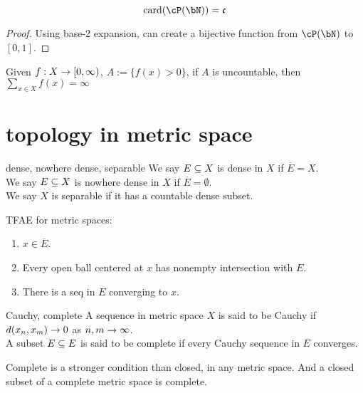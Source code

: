 \documentclass[lang=cn,11pt]{elegantbook}
\begin{document}
\begin{proposition}
    \begin{equation}
        \card(\cP(\bN)) = \mathfrak{c}
    \end{equation}
\end{proposition}
\begin{proof}
    Using base-2 expansion, can create a bijective function from $\cP(\bN)$ to $[0,1]$.
\end{proof}


\begin{proposition}
    Given $f: X \rightarrow [0,\infty)$, $A:= \{ f(x)>0 \}$, if $A$ is uncountable, then $\sum_{x \in X}f(x) = \infty$
\end{proposition}


\section{topology in metric space}
\begin{definition}{dense, nowhere dense, separable}
We say $E \subseteq X$ is dense in $X$ if $\overline{E} = X$.\\
We say $E \subseteq X$ is nowhere dense in $X$ if 
$\overline{E} = \emptyset $.\\
We say $X$ is separable if it has a countable dense subset.
\end{definition}


\begin{proposition}
    TFAE for metric spaces:
    \begin{enumerate}
        \item $x \in \overline{E}$.
        \item Every open ball centered at $x$ has nonempty intersection with $E$.
        \item There is a seq in $E$ converging to $x$.
    \end{enumerate}
\end{proposition}


\begin{definition}{Cauchy, complete}
    A sequence in metric space $X$ is said to be Cauchy if $d(x_n,x_m) \rightarrow 0$ as $n,m \rightarrow \infty$.\\
    A subset $E\subseteq E$ is said to be complete if every Cauchy sequence in $E$ converges.
\end{definition}

\begin{proposition}
    Complete is a stronger condition than closed, in any metric space. And a closed subset of a complete metric space is complete.
\end{proposition}
\end{document}
